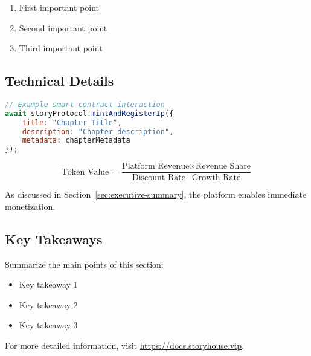 \begin{enumerate}
    \item First important point
    \item Second important point
    \item Third important point
\end{enumerate}

\subsection{Technical Details}

\begin{lstlisting}[language=JavaScript, caption=Example Code Block]
// Example smart contract interaction
await storyProtocol.mintAndRegisterIp({
    title: "Chapter Title",
    description: "Chapter description",
    metadata: chapterMetadata
});
\end{lstlisting}

\begin{equation}
\text{Token Value} = \frac{\text{Platform Revenue} \times \text{Revenue Share}}{\text{Discount Rate} - \text{Growth Rate}}
\label{eq:token-value}
\end{equation}

As discussed in Section~\ref{sec:executive-summary}, the platform enables immediate monetization.


\subsection{Key Takeaways}

Summarize the main points of this section:

\begin{itemize}
    \item Key takeaway 1
    \item Key takeaway 2  
    \item Key takeaway 3
\end{itemize}

For more detailed information, visit \url{https://docs.storyhouse.vip}.

